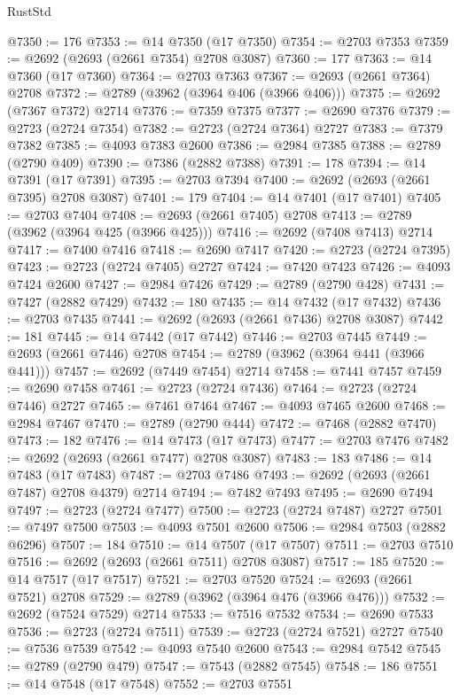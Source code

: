 \begin{lexlean}{RustStd}
\begin{coremodule}
@7350 := 176
@7353 := @14 @7350 (@17 @7350)
@7354 := @2703 @7353
@7359 := @2692 (@2693 (@2661 @7354) @2708 @3087)
@7360 := 177
@7363 := @14 @7360 (@17 @7360)
@7364 := @2703 @7363
@7367 := @2693 (@2661 @7364) @2708
@7372 := @2789 (@3962 (@3964 @406 (@3966 @406)))
@7375 := @2692 (@7367 @7372) @2714
@7376 := @7359 @7375
@7377 := @2690 @7376
@7379 := @2723 (@2724 @7354)
@7382 := @2723 (@2724 @7364) @2727
@7383 := @7379 @7382
@7385 := @4093 @7383 @2600
@7386 := @2984 @7385
@7388 := @2789 (@2790 @409)
@7390 := @7386 (@2882 @7388)
@7391 := 178
@7394 := @14 @7391 (@17 @7391)
@7395 := @2703 @7394
@7400 := @2692 (@2693 (@2661 @7395) @2708 @3087)
@7401 := 179
@7404 := @14 @7401 (@17 @7401)
@7405 := @2703 @7404
@7408 := @2693 (@2661 @7405) @2708
@7413 := @2789 (@3962 (@3964 @425 (@3966 @425)))
@7416 := @2692 (@7408 @7413) @2714
@7417 := @7400 @7416
@7418 := @2690 @7417
@7420 := @2723 (@2724 @7395)
@7423 := @2723 (@2724 @7405) @2727
@7424 := @7420 @7423
@7426 := @4093 @7424 @2600
@7427 := @2984 @7426
@7429 := @2789 (@2790 @428)
@7431 := @7427 (@2882 @7429)
@7432 := 180
@7435 := @14 @7432 (@17 @7432)
@7436 := @2703 @7435
@7441 := @2692 (@2693 (@2661 @7436) @2708 @3087)
@7442 := 181
@7445 := @14 @7442 (@17 @7442)
@7446 := @2703 @7445
@7449 := @2693 (@2661 @7446) @2708
@7454 := @2789 (@3962 (@3964 @441 (@3966 @441)))
@7457 := @2692 (@7449 @7454) @2714
@7458 := @7441 @7457
@7459 := @2690 @7458
@7461 := @2723 (@2724 @7436)
@7464 := @2723 (@2724 @7446) @2727
@7465 := @7461 @7464
@7467 := @4093 @7465 @2600
@7468 := @2984 @7467
@7470 := @2789 (@2790 @444)
@7472 := @7468 (@2882 @7470)
@7473 := 182
@7476 := @14 @7473 (@17 @7473)
@7477 := @2703 @7476
@7482 := @2692 (@2693 (@2661 @7477) @2708 @3087)
@7483 := 183
@7486 := @14 @7483 (@17 @7483)
@7487 := @2703 @7486
@7493 := @2692 (@2693 (@2661 @7487) @2708 @4379) @2714
@7494 := @7482 @7493
@7495 := @2690 @7494
@7497 := @2723 (@2724 @7477)
@7500 := @2723 (@2724 @7487) @2727
@7501 := @7497 @7500
@7503 := @4093 @7501 @2600
@7506 := @2984 @7503 (@2882 @6296)
@7507 := 184
@7510 := @14 @7507 (@17 @7507)
@7511 := @2703 @7510
@7516 := @2692 (@2693 (@2661 @7511) @2708 @3087)
@7517 := 185
@7520 := @14 @7517 (@17 @7517)
@7521 := @2703 @7520
@7524 := @2693 (@2661 @7521) @2708
@7529 := @2789 (@3962 (@3964 @476 (@3966 @476)))
@7532 := @2692 (@7524 @7529) @2714
@7533 := @7516 @7532
@7534 := @2690 @7533
@7536 := @2723 (@2724 @7511)
@7539 := @2723 (@2724 @7521) @2727
@7540 := @7536 @7539
@7542 := @4093 @7540 @2600
@7543 := @2984 @7542
@7545 := @2789 (@2790 @479)
@7547 := @7543 (@2882 @7545)
@7548 := 186
@7551 := @14 @7548 (@17 @7548)
@7552 := @2703 @7551

\end{coremodule}
\end{lexlean}
